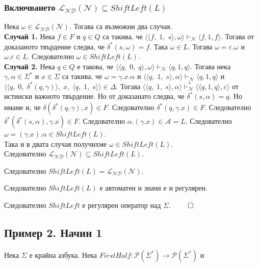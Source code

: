 \documentclass[12pt]{article}
\begin{document}
\subsubsection*{Включването \(\mathcal{L_{ND}}(\mathcal N) \subseteq ShiftLeft(L)\)}
Нека \(\omega \in \mathcal{L_{ND}}(\mathcal N)\). Тогава са възможни два случая. \\

\textbf{Случай 1.}
Нека \(f \in F\) и \(q \in Q\) са такива, че \(\langle \langle f,\; 1,\; s \rangle, \omega \rangle \vdash_{\mathcal N} \langle f, 1, f \rangle\). Тогава от доказаното твърдение следва, че \(\delta^*(s, \omega) = f\).
Така \(\omega \in L\). Тогава \(\omega = \varepsilon.\omega\) и \(\omega.\varepsilon \in L\).
Следователно \(\omega \in ShiftLeft(L)\). \\

\textbf{Случай 2.}
Нека \(q \in Q\) е такова, че \(\langle \langle q,\; 0,\; q \rangle, \omega \rangle \vdash_{\mathcal N} \langle q, 1, q \rangle\). Тогава нека \(\gamma, \alpha \in \Sigma^*\) и \(x \in \Sigma\)  са такива, че \(\omega = \gamma.x.\alpha\) и
\(\langle \langle q,\; 1,\; s \rangle, \alpha \rangle \vdash_{\mathcal N} \langle q, 1, q \rangle\) и \(\langle \langle q,\; 0,\; \delta^*(q, \gamma) \rangle,\; x,\; \langle q,\; 1,\; s \rangle \rangle \in \Delta\).
Тогава \(\langle \langle q,\; 1,\; s \rangle, \alpha \rangle \vdash_{\mathcal N}^* \langle \langle q, 1, q \rangle, \varepsilon \rangle \) от истински важното твърдение. Но от доказанато следва, че
\(\delta^*(s, \alpha) = q\). Но имаме и, че \(\delta(\delta^*(q, \gamma), x) \in F\).
Следователно \(\delta^*(q, \gamma.x) \in F\).
Следователно \(\delta^*(\delta^*(s, \alpha), \gamma.x) \in F\).
Следователно \(\alpha.(\gamma.x) \in \mathcal{A} = L\).
Следователно \(\omega = (\gamma.x).\alpha \in ShiftLeft(L)\). \\

Така и в двата случая получихме \(\omega \in  ShiftLeft(L)\). \\

Следователно \(\mathcal{L_{ND}}(\mathcal N) \subseteq ShiftLeft(L)\).

Следователно \(ShiftLeft(L) = \mathcal{L_{ND}}(\mathcal N)\).

Следователно \(ShiftLeft(L)\) е автоматен и значи е и регулярен.

Следователно \(ShiftLeft\) е регулярен оператор над \(\Sigma\). \(\qed\)

\subsection*{Пример 2. Начин 1}
Нека \(\Sigma\) е крайна азбука.
Нека \(FirstHalf : \mathcal{P}(\Sigma^*) \to \mathcal{P}(\Sigma^*)\) и
\end{document}
